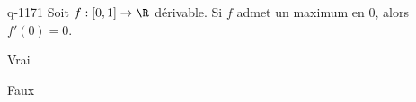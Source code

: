 \begin{truefalse}{q-1171}
Soit $f : \left[ 0, 1 \right] \to \R$ dérivable. \newline Si $f$ admet un maximum en $0$, alors $f'(0)=0$.
\item Vrai
\item* Faux
\end{truefalse}

